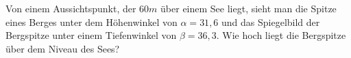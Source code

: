 
Von einem Aussichtspunkt, der $60m$ über einem See liegt, sieht man die Spitze eines
Berges unter dem Höhenwinkel von $\alpha = 31,6$ und das Spiegelbild der Bergspitze
unter einem Tiefenwinkel von $\beta = 36,3$. Wie hoch liegt die Bergspitze über dem
Niveau des Sees?
